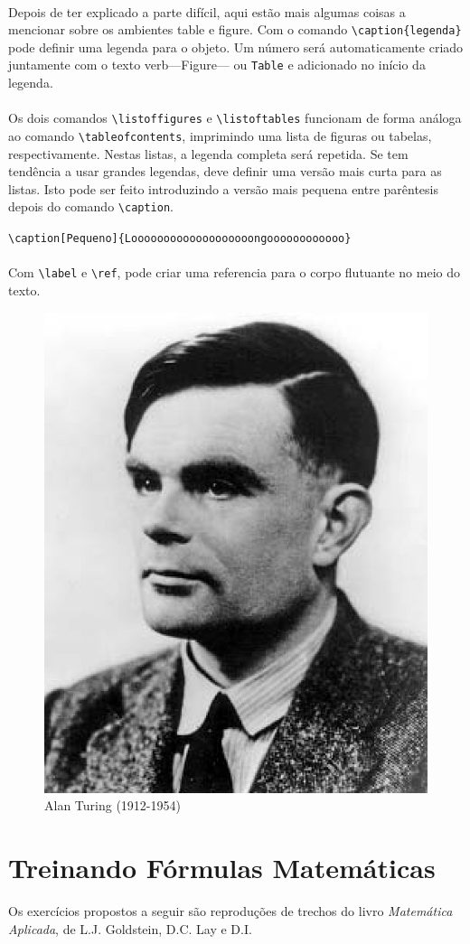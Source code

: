 \documentclass[a4paper,10pt]{report}
\begin{document}
\paragraph{}
Depois de ter explicado a parte difícil, aqui estão mais algumas coisas a mencionar sobre os ambientes table e figure. Com o comando \verb|\caption{legenda}| pode definir uma legenda para o objeto. Um número será automaticamente criado juntamente com o texto verb—Figure— ou \verb|Table| e adicionado no início da legenda.

\paragraph{}
Os dois comandos \verb|\listoffigures| e \verb|\listoftables| funcionam de forma análoga ao comando \verb|\tableofcontents|, imprimindo uma lista de figuras ou tabelas, respectivamente. Nestas listas, a legenda completa será repetida. Se tem tendência a usar grandes legendas, deve definir uma versão mais curta para as listas. Isto pode ser feito introduzindo a versão mais pequena entre parêntesis depois do comando \verb|\caption|.
\begin{center}
        \verb|\caption[Pequeno]{Looooooooooooooooooongoooooooooooo}|
\end{center}

\paragraph{}
Com \verb|\label| e \verb|\ref|, pode criar uma referencia para o corpo flutuante no
meio do texto.
\begin{figure}
\centering
\includegraphics[width=0.4 \textwidth]{turing.png}
\caption{Alan Turing (1912-1954)}
\end{figure}


\section{Treinando Fórmulas Matemáticas}
Os exercícios propostos a seguir são reproduções de trechos do livro \textit{Matemática Aplicada}, de L.J. Goldstein, D.C. Lay e D.I.
\end{document}
